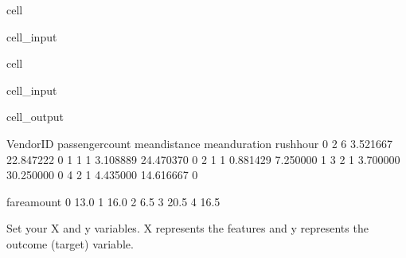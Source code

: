 \documentclass[letterpaper,10pt,english]{sphinxmanual}
\begin{document}
\begin{sphinxuseclass}{cell}
\begin{sphinxuseclass}{cell_input}
\begin{sphinxVerbatim}[commandchars=\\\{\}]
  
  \PYG{p}{[}\PYG{p}{[}\PYG{p}{]}\PYG{p}{]}
\end{sphinxVerbatim}

\end{sphinxuseclass}
\end{sphinxuseclass}
\begin{sphinxuseclass}{cell}
\begin{sphinxuseclass}{cell_input}
\begin{sphinxVerbatim}[commandchars=\\\{\}]
\end{sphinxVerbatim}

\end{sphinxuseclass}
\begin{sphinxuseclass}{cell_output}
\begin{sphinxVerbatim}[commandchars=\\\{\}]
   VendorID  passenger\PYGZus{}count  mean\PYGZus{}distance  mean\PYGZus{}duration  rush\PYGZus{}hour
0         2                6       3.521667      22.847222          0
1         1                1       3.108889      24.470370          0
2         1                1       0.881429       7.250000          1
3         2                1       3.700000      30.250000          0
4         2                1       4.435000      14.616667          0

   fare\PYGZus{}amount
0         13.0
1         16.0
2          6.5
3         20.5
4         16.5
\end{sphinxVerbatim}

\end{sphinxuseclass}
\end{sphinxuseclass}
\sphinxAtStartPar
Set your X and y variables. X represents the features and y represents the outcome (target) variable.
\end{document}
